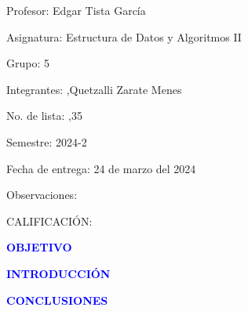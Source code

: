 \documentclass[12pt]{article}
\newcommand{\Profesor}{Profesor: Edgar Tista García}
\newcommand{\Materia}{Asignatura: Estructura de Datos y Algoritmos II}
\newcommand{\Grupo}{Grupo:  5}
\newcommand{\Nombre}{Integrantes:   ,Quetzalli Zarate Menes}
\newcommand{\NoLista}{No. de lista:     ,35}
\newcommand{\Semestre}{Semestre: 2024-2}
\newcommand{\Fecha}{Fecha de entrega: 24 de marzo del 2024}
\newcommand{\Observaciones}{Observaciones:}
\newcommand{\Calificacion}{CALIFICACIÓN:}
\begin{document}
    
    \Large{\Profesor}\par\vspace{0.6cm}
    \Large{\Materia}\par\vspace{0.6cm}
    \Large{\Grupo}\par\vspace{0.6cm}
    \Large{\Nombre}\par\vspace{0.6cm}
    \Large{\NoLista}\par\vspace{0.6cm}
    \Large{\Semestre}\par\vspace{0.6cm}
    \Large{\Fecha}\par\vspace{0.6cm}
    \Large{\Observaciones}\par\vspace{0.6cm}

    \begin{center}
        \Large{\Calificacion}\par\vspace{0.6cm}
    \end{center}
    
    \newpage
    \textcolor{blue}{\textbf{OBJETIVO}}


    \par\vspace{1.5cm}

    \textcolor{blue}{\textbf{INTRODUCCIÓN}}







    \textcolor{blue}{\textbf{CONCLUSIONES}}
























    
\end{document}

